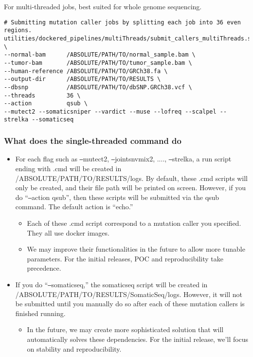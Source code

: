\documentclass[10pt,letterpaper]{article}
\begin{document}
\begin{sloppypar}
For multi-threaded jobs, best suited for whole genome sequencing. 

\begin{lstlisting}
# Submitting mutation caller jobs by splitting each job into 36 even regions.
utilities/dockered_pipelines/multiThreads/submit_callers_multiThreads.sh \
--normal-bam      /ABSOLUTE/PATH/TO/normal_sample.bam \
--tumor-bam       /ABSOLUTE/PATH/TO/tumor_sample.bam \
--human-reference /ABSOLUTE/PATH/TO/GRCh38.fa \
--output-dir      /ABSOLUTE/PATH/TO/RESULTS \
--dbsnp           /ABSOLUTE/PATH/TO/dbSNP.GRCh38.vcf \
--threads         36 \
--action          qsub \
--mutect2 --somaticsniper --vardict --muse --lofreq --scalpel --strelka --somaticseq
\end{lstlisting}



\subsubsection{What does the single-threaded command do}

\begin{itemize}
  \item
  For each flag such as \texttt{--}mutect2, \texttt{--}jointsnvmix2, ...., \texttt{--}strelka, a run script ending with .cmd will be created in /ABSOLUTE/PATH/TO/RESULTS/logs. By default, these .cmd scripts will only be created, and their file path will be printed on screen. However, if you do ``\texttt{--}action qsub'', then these scripts will be submitted via the qsub command. The default action is ``echo.''

    \begin{itemize}
    \item Each of these .cmd script correspond to a mutation caller you specified. They all use docker images.
    \item We may improve their functionalities in the future to allow more tunable parameters. For the initial releases, POC and reproducibility take precedence.
    \end{itemize}
  
  \item
  If you do ``\texttt{--}somaticseq,'' the somaticseq script will be created in /ABSOLUTE/PATH/TO/RESULTS/SomaticSeq/logs. However, it will not be submitted until you manually do so after each of these mutation callers is finished running. 
      
    \begin{itemize}
    \item   
     In the future, we may create more sophisticated solution that will automatically solves these dependencies. For the initial release, we'll focus on stability and reproducibility. 
    \end{itemize}
  

\end{itemize}
\end{sloppypar}
\end{document}
